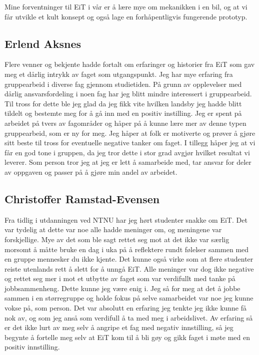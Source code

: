 Mine forventninger til EiT i vår er å lære mye om mekanikken i en bil, og at 
vi får utvikle et kult konsept og også lage en forhåpentligvis fungerende prototyp.

\subsection*{Erlend Aksnes} Flere venner og bekjente hadde fortalt om erfaringer og historier fra EiT som gav meg et dårlig intrykk av faget som utgangspunkt. 
Jeg har mye erfaring fra gruppearbeid i diverse fag gjennom studietiden.
 På grunn av opplevelser med dårlig ansvarsfordeling i noen fag har jeg blitt mindre interessert i gruppearbeid. 
Til tross for dette ble jeg glad da jeg fikk vite hvilken landsby jeg hadde blitt tildelt og bestemte meg for å gå inn med en positiv instilling.
Jeg er spent på arbeidet på tvers av fagområder og håper på å kunne lære mer av denne typen gruppearbeid, som er ny for meg.  
Jeg håper at folk er motiverte og prøver å gjøre sitt beste til tross for eventuelle negative tanker om faget. 
I tillegg håper jeg at vi får en god tone i gruppen, da jeg tror dette i stor grad avgjør hvilket resultat vi leverer. 
Som person tror jeg at jeg er lett å samarbeide med, tar ansvar for deler av oppgaven og passer på å gjøre min andel av arbeidet. 

\subsection*{Christoffer Ramstad-Evensen}
Fra tidlig i utdanningen ved NTNU har jeg hørt studenter snakke om EiT. Det var tydelig at dette var noe alle hadde 
meninger om, og meningene var forskjellige. Mye av det som ble sagt rettet seg mot at det ikke var særlig morsomt 
å måtte bruke en dag i uka på å reflektere rundt følelser sammen med en gruppe mennesker du ikke kjente. Det 
kunne også virke som at flere studenter reiste utenlands rett å slett for å unngå EiT. Alle meninger var dog ikke 
negative og rettet seg mer i mot et utbytte av faget som var verdifullt med tanke på jobbsammenheng. Dette kunne 
jeg være enig i. Jeg så for meg at det å jobbe sammen i en størregruppe og holde fokus på selve samarbeidet var 
noe jeg kunne vokse på, som person. Det var absolutt en erfaring jeg tenkte jeg ikke kunne få nok av, og som jeg 
anså som verdifull å ta med meg i arbeidslivet. Av erfaring så er det ikke lurt av meg selv å angripe et fag med 
negativ innstilling, så jeg begynte å fortelle meg selv at EiT kom til å bli gøy og gikk faget i møte med en positiv 
innstilling. 

